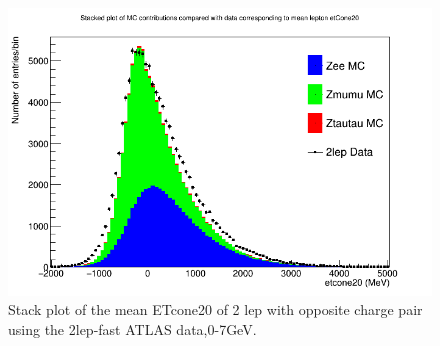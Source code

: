 \begin{figure}[h!]
    \centering
	\includegraphics[width=0.85\linewidth]{plots/16-02-2021/2lep-Zee-Zmumu-Ztautau-fast_mean-etcone20_-2-5GeV_16-02-21_16-28.png}
	\caption{Stack plot of the mean ETcone20 of 2 lep with opposite charge pair using the 2lep-fast ATLAS data,0-7GeV. }\label{fig:2lep-Zee-Zmumu-Ztautau-fast_mean-etcone20_-2-5GeV_16-02-21_16-28}
\end{figure}